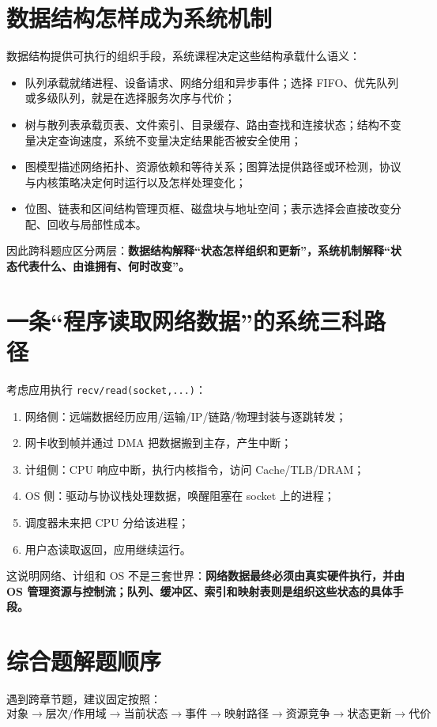 \documentclass[11pt,a4paper,openany]{ctexbook}
\newcommand{\key}[1]{\textbf{\color{deep}#1}}
\begin{document}
\section{数据结构怎样成为系统机制}
数据结构提供可执行的组织手段，系统课程决定这些结构承载什么语义：
\begin{itemize}
  \item 队列承载就绪进程、设备请求、网络分组和异步事件；选择 FIFO、优先队列或多级队列，就是在选择服务次序与代价；
  \item 树与散列表承载页表、文件索引、目录缓存、路由查找和连接状态；结构不变量决定查询速度，系统不变量决定结果能否被安全使用；
  \item 图模型描述网络拓扑、资源依赖和等待关系；图算法提供路径或环检测，协议与内核策略决定何时运行以及怎样处理变化；
  \item 位图、链表和区间结构管理页框、磁盘块与地址空间；表示选择会直接改变分配、回收与局部性成本。
\end{itemize}
因此跨科题应区分两层：\key{数据结构解释“状态怎样组织和更新”，系统机制解释“状态代表什么、由谁拥有、何时改变”。}

\section{一条“程序读取网络数据”的系统三科路径}
考虑应用执行 \texttt{recv/read(socket,...)}：
\begin{enumerate}
  \item 网络侧：远端数据经历应用/运输/IP/链路/物理封装与逐跳转发；
  \item 网卡收到帧并通过 DMA 把数据搬到主存，产生中断；
  \item 计组侧：CPU 响应中断，执行内核指令，访问 Cache/TLB/DRAM；
  \item OS 侧：驱动与协议栈处理数据，唤醒阻塞在 socket 上的进程；
  \item 调度器未来把 CPU 分给该进程；
  \item 用户态读取返回，应用继续运行。
\end{enumerate}
这说明网络、计组和 OS 不是三套世界：\textbf{网络数据最终必须由真实硬件执行，并由 OS 管理资源与控制流；队列、缓冲区、索引和映射表则是组织这些状态的具体手段。}

\section{综合题解题顺序}
遇到跨章节题，建议固定按照：
\[
\boxed{\text{对象}\rightarrow\text{层次/作用域}\rightarrow\text{当前状态}\rightarrow\text{事件}\rightarrow\text{映射路径}\rightarrow\text{资源竞争}\rightarrow\text{状态更新}\rightarrow\text{代价}}
\]
\end{document}
